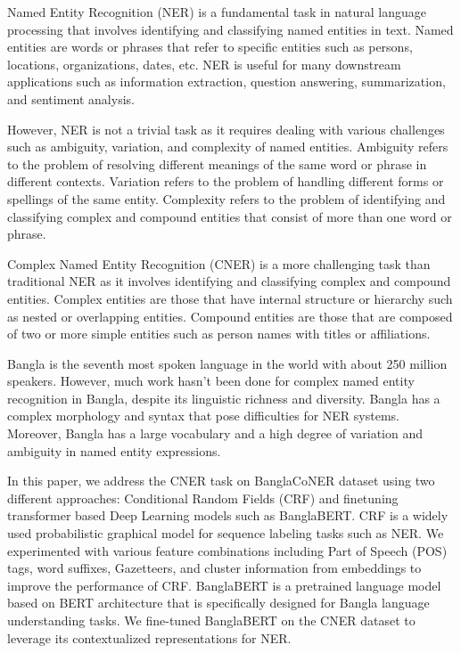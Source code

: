 \documentclass{article}
\begin{document}
Named Entity Recognition (NER) is a fundamental task in natural language processing that involves identifying and classifying named entities in text. Named entities are words or phrases that refer to specific entities such as persons, locations, organizations, dates, etc. NER is useful for many downstream applications such as information extraction, question answering, summarization, and sentiment analysis.

However, NER is not a trivial task as it requires dealing with various challenges such as ambiguity, variation, and complexity of named entities. Ambiguity refers to the problem of resolving different meanings of the same word or phrase in different contexts. Variation refers to the problem of handling different forms or spellings of the same entity. Complexity refers to the problem of identifying and classifying complex and compound entities that consist of more than one word or phrase.

Complex Named Entity Recognition (CNER) is a more challenging task than traditional NER as it involves identifying and classifying complex and compound entities. Complex entities are those that have internal structure or hierarchy such as nested or overlapping entities. Compound entities are those that are composed of two or more simple entities such as person names with titles or affiliations.

Bangla is the seventh most spoken language in the world with about 250 million speakers. However, much work hasn’t been done for complex named entity recognition in Bangla, despite its linguistic richness and diversity. Bangla has a complex morphology and syntax that pose difficulties for NER systems. Moreover, Bangla has a large vocabulary and a high degree of variation and ambiguity in named entity expressions.

In this paper, we address the CNER task on BanglaCoNER dataset using two different approaches: Conditional Random Fields (CRF) and finetuning transformer based Deep Learning models such as BanglaBERT. CRF is a widely used probabilistic graphical model for sequence labeling tasks such as NER. We experimented with various feature combinations including Part of Speech (POS) tags, word suffixes, Gazetteers, and cluster information from embeddings to improve the performance of CRF. BanglaBERT is a pretrained language model based on BERT architecture that is specifically designed for Bangla language understanding tasks. We fine-tuned BanglaBERT on the CNER dataset to leverage its contextualized representations for NER.
\end{document}
